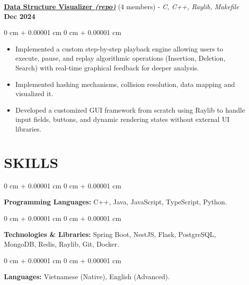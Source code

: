 \documentclass[9pt, letterpaper]{extarticle}
\newenvironment{highlights}{
    \begin{itemize}[
    topsep=2pt,
    itemsep=2pt,
    parsep=0pt,
    partopsep=0pt,
    leftmargin=10pt
]
}{
    \end{itemize}
} %
\newenvironment{onecolentry}{
    \begin{adjustwidth}{
        0 cm + 0.00001 cm
    }{
        0 cm + 0.00001 cm
    }
}{
    \end{adjustwidth}
} %
\begin{document}
    \vspace{0.2cm}
    
    \underline{\textbf{Data Structure Visualizer \href{https://github.com/BearSunny/Project_CS163}{\textit{(\textcolor{customred}{repo})}}}} (4 members) - \textit{C, C++, Raylib, Makefile}
    \hfill
    \textbf{Dec 2024}

    \vspace{0.10 cm}
    
    \begin{onecolentry}
        \begin{highlights}
            \item Implemented a custom step-by-step playback engine allowing users to execute, pause, and replay algorithmic operations (Insertion, Deletion, Search) with real-time graphical feedback for deeper analysis.
            \item Implemented hashing mechanisms, collision resolution, data mapping and visualized it.
            \item Developed a customized GUI framework from scratch using Raylib to handle input fields, buttons, and dynamic rendering states without external UI libraries.
        \end{highlights}
    \end{onecolentry}


    \section{\textbf{SKILLS}}        
    \begin{onecolentry}
        \textbf{Programming Languages:} C++, Java, JavaScript, TypeScript, Python.
    \end{onecolentry}

    \vspace{0.1 cm}

    \begin{onecolentry}
        \textbf{Technologies \& Libraries:} Spring Boot, NestJS, Flask, PostgreSQL, MongoDB, Redis, Raylib, Git, Docker.
    \end{onecolentry}

    \vspace{0.1 cm}

    \begin{onecolentry}
        \textbf{Languages:} Vietnamese (Native), English (Advanced).
    \end{onecolentry}
        
\end{document}
